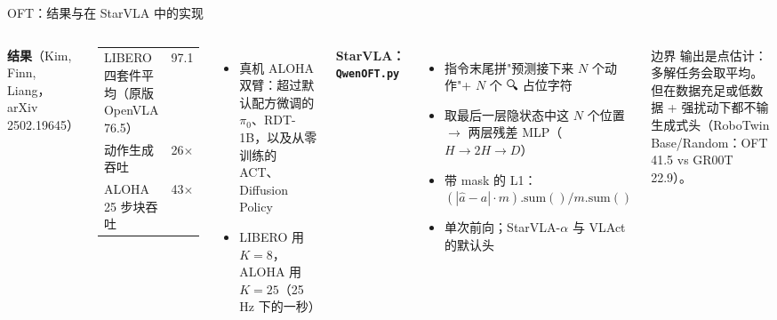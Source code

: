\documentclass[aspectratio=169,10pt]{beamer}
\newcommand{\HL}[1]{\textcolor{emphasis}{#1}}
\begin{document}
\begin{frame}{OFT：结果与在 StarVLA 中的实现}
  \begin{columns}[T]
    \textbf{结果}（Kim, Finn, Liang，arXiv 2502.19645）
    \begin{center}\footnotesize
    \begin{tabular}{lr}
      \toprule
      LIBERO 四套件平均（原版 OpenVLA 76.5） & \HL{97.1} \\
      动作生成吞吐 & \HL{26$\times$} \\
      ALOHA 25 步块吞吐 & 43$\times$ \\
      \bottomrule
    \end{tabular}
    \end{center}
    \begin{itemize}
      \item 真机 ALOHA 双臂：超过默认配方微调的 $\pi_0$、RDT-1B，以及从零训练的 ACT、Diffusion Policy
      \item LIBERO 用 $K=8$，ALOHA 用 $K=25$（25 Hz 下的一秒）
    \end{itemize}
    \textbf{StarVLA：\texttt{QwenOFT.py}}
    \begin{itemize}
      \item 指令末尾拼"预测接下来 $N$ 个动作"+ $N$ 个 🔍 占位字符
      \item 取最后一层隐状态中这 $N$ 个位置 $\to$ 两层残差 MLP（$H\to2H\to D$）
      \item 带 mask 的 L1：$(|\hat a-a|\cdot m).\mathrm{sum}()/m.\mathrm{sum}()$
      \item 单次前向；StarVLA-$\alpha$ 与 VLAct 的默认头
    \end{itemize}
    \begin{alertblock}{边界}
      输出是点估计：多解任务会取平均。但在数据充足或低数据 + 强扰动下都不输生成式头（RoboTwin Base/Random：OFT 41.5 vs GR00T 22.9）。
    \end{alertblock}
  \end{columns}
\end{frame}

\end{document}
